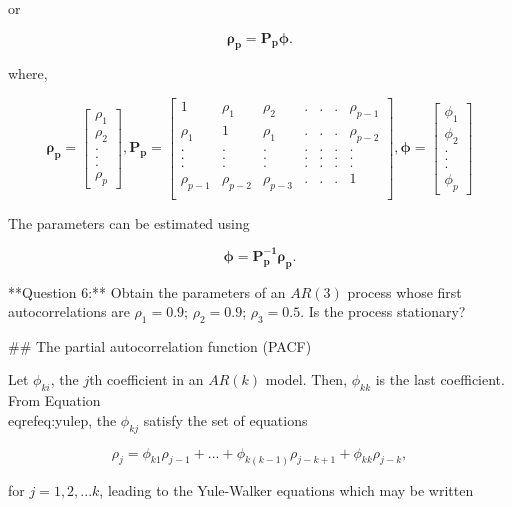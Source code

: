 \documentclass[11pt,a4paper,]{article}
\begin{document}
{or 

$$\bm{\rho_p}=\bm{P_p\phi}.$$

 where,
 
$$\bm{\rho_p} = \left[\begin{array}
{r}
\rho_1  \\
\rho_2  \\
.\\
.\\
.\\
\rho_p
\end{array}\right], \bm{P_p} = \left[\begin{array}
{rrrrrrr}
1 & \rho_1 & \rho_2 & .&.&.& \rho_{p-1} \\
\rho_1 & 1 & \rho_1 & .&.&.& \rho_{p-2} \\
. & . & . & .&.&.& . \\
. & . & . & .&.&.& . \\
. & . & . & .&.&.& . \\
\rho_{p-1} & \rho_{p-2} & \rho_{p-3} & .&.&.& 1 \\
\end{array}\right], \bm{\phi} = \left[\begin{array}
{r}
\phi_1  \\
\phi_2  \\
.\\
.\\
.\\
\phi_p
\end{array}\right]$$

The parameters can be estimated using 

$$\bm{\phi}=\bm{P_p^{-1}\rho_p}.$$

**Question 6:** Obtain the parameters of an $AR(3)$ process whose first autocorrelations are $\rho_1=0.9$; $\rho_2=0.9$; $\rho_3=0.5$. Is the process stationary?

## The partial autocorrelation function (PACF)


Let $\phi_{ki}$, the $j$th coefficient in an $AR(k)$ model. Then, $\phi_{kk}$ is the last coefficient. From Equation \\eqref{eq:yulep}, the $\phi_{kj}$ satisfy the set of equations

\begin{equation}
\label{eq:pacf}
\rho_j=\phi_{k1}\rho_{j-1}+...+\phi_{k(k-1)}\rho_{j-k+1}+\phi_{kk}\rho_{j-k},
\end{equation}

for $j=1, 2, ...k$, leading to the Yule-Walker equations which may be written

}
\end{document}
